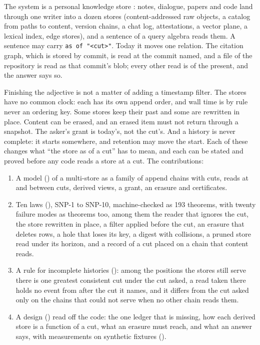 \documentclass[11pt]{article}
\theoremstyle{plain}
\theoremstyle{definition}
\begin{document}
The system is a personal knowledge store \cite{serranocalva2026palace}: notes, dialogue, papers and
code land through one writer into a dozen stores (content-addressed raw objects, a catalog from
paths to content, version chains, a chat log, attestations, a vector plane, a lexical index, edge
stores), and a sentence of a query algebra reads them. A sentence may carry
\texttt{as of "<cut>"}. Today it moves one relation. The citation graph, which is
stored by commit, is read at the commit named, and a file of the repository is read as that
commit's blob; every other read is of the present, and the answer says so.

Finishing the adjective is not a matter of adding a timestamp filter. The stores have no common
clock: each has its own append order, and wall time is by rule never an ordering key. Some stores
keep their past and some are rewritten in place. Content can be erased, and an erased item must
not return through a snapshot. The asker's grant is today's, not the cut's. And a history is never
complete: it starts somewhere, and retention may move the start. Each of these changes what
``the store as of a cut'' has to mean, and each can be stated and proved before any code reads a
store at a cut. The contributions:
\begin{enumerate}
\item A model () of a multi-store as a family of append chains with cuts, reads at
  and between cuts, derived views, a grant, an erasure and certificates.
\item Ten laws (), SNP-1 to SNP-10, machine-checked as 193 theorems, with twenty
  failure modes as theorems too, among them the reader that ignores the cut, the store rewritten
  in place, a filter applied before the cut, an erasure that deletes rows, a hole that loses its
  key, a digest with collisions, a pruned store read under its horizon, and a record of a cut
  placed on a chain that content reads.
\item A rule for incomplete histories (): among the positions the stores still
  serve there is one greatest consistent cut under the cut asked, a read taken there holds no
  event from after the cut it names, and it differs from the cut asked only on the chains that
  could not serve when no other chain reads them.
\item A design () read off the code: the one ledger that is missing, how each
  derived store is a function of a cut, what an erasure must reach, and what an answer says,
  with measurements on synthetic fixtures ().
\end{enumerate}
\end{document}
